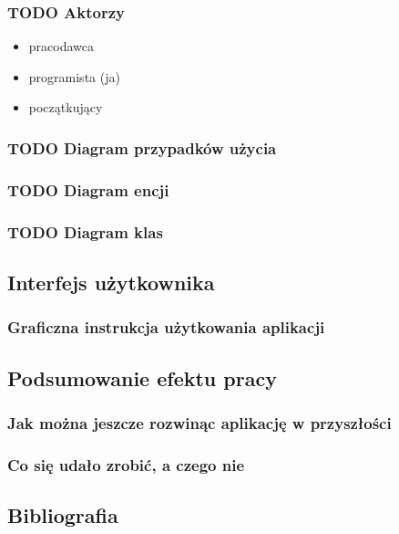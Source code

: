 \documentclass[11pt]{article}
\begin{document}
\subsubsection{{\bfseries\sffamily TODO} Aktorzy}
\label{sec:org27d89c3}
\begin{itemize}
\item pracodawca
\item programista (ja)
\item początkujący
\end{itemize}
\subsubsection{{\bfseries\sffamily TODO} Diagram przypadków użycia}
\label{sec:org10ba167}
\subsubsection{{\bfseries\sffamily TODO} Diagram encji}
\label{sec:org15062fa}
\subsubsection{{\bfseries\sffamily TODO} Diagram klas}
\label{sec:org85e93b3}
\subsection{Interfejs użytkownika}
\label{sec:orgf2c3bdf}
\subsubsection{Graficzna instrukcja użytkowania aplikacji}
\label{sec:orgff500fe}
\subsection{Podsumowanie efektu pracy}
\label{sec:org1cbad59}
\subsubsection{Jak można jeszcze rozwinąc aplikację w przyszłości}
\label{sec:orgf07b9e7}
\subsubsection{Co się udało zrobić, a czego nie}
\label{sec:orgc5da7f2}
\subsection{Bibliografia}
\label{sec:org27afaaf}
\end{document}
